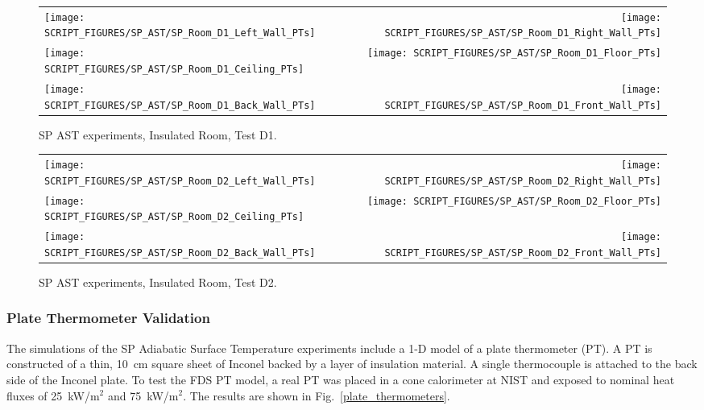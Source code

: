 \begin{figure}[p]
\begin{tabular*}{\textwidth}{l@{\extracolsep{\fill}}r}
\texttt{[image: SCRIPT\_FIGURES/SP\_AST/SP\_Room\_D1\_Left\_Wall\_PTs]} &  \texttt{[image: SCRIPT\_FIGURES/SP\_AST/SP\_Room\_D1\_Right\_Wall\_PTs]}  \\
\texttt{[image: SCRIPT\_FIGURES/SP\_AST/SP\_Room\_D1\_Ceiling\_PTs]}   &  \texttt{[image: SCRIPT\_FIGURES/SP\_AST/SP\_Room\_D1\_Floor\_PTs]}  \\
\texttt{[image: SCRIPT\_FIGURES/SP\_AST/SP\_Room\_D1\_Back\_Wall\_PTs]} &  \texttt{[image: SCRIPT\_FIGURES/SP\_AST/SP\_Room\_D1\_Front\_Wall\_PTs]}
\end{tabular*}
\caption[SP AST experiments, Insulated Room, Test D1]{SP AST experiments, Insulated Room, Test D1.}
\label{SP_Room_D1_PTs}
\end{figure}

\begin{figure}[p]
\begin{tabular*}{\textwidth}{l@{\extracolsep{\fill}}r}
\texttt{[image: SCRIPT\_FIGURES/SP\_AST/SP\_Room\_D2\_Left\_Wall\_PTs]} &  \texttt{[image: SCRIPT\_FIGURES/SP\_AST/SP\_Room\_D2\_Right\_Wall\_PTs]}  \\
\texttt{[image: SCRIPT\_FIGURES/SP\_AST/SP\_Room\_D2\_Ceiling\_PTs]}   &  \texttt{[image: SCRIPT\_FIGURES/SP\_AST/SP\_Room\_D2\_Floor\_PTs]}  \\
\texttt{[image: SCRIPT\_FIGURES/SP\_AST/SP\_Room\_D2\_Back\_Wall\_PTs]} &  \texttt{[image: SCRIPT\_FIGURES/SP\_AST/SP\_Room\_D2\_Front\_Wall\_PTs]}
\end{tabular*}
\caption[SP AST experiments, Insulated Room, Test D2]{SP AST experiments, Insulated Room, Test D2.}
\label{SP_Room_D2_PTs}
\end{figure}


\clearpage


\subsubsection{Plate Thermometer Validation}

The simulations of the SP Adiabatic Surface Temperature experiments include a 1-D model of a plate thermometer (PT). A PT is constructed of a thin, 10~cm square sheet of Inconel backed by a layer of insulation material. A single thermocouple is attached to the back side of the Inconel plate. To test the FDS PT model, a real PT was placed in a cone calorimeter at NIST and exposed to nominal heat fluxes of 25~kW/m$^2$ and 75~kW/m$^2$. The results are shown in Fig.~\ref{plate_thermometers}.

